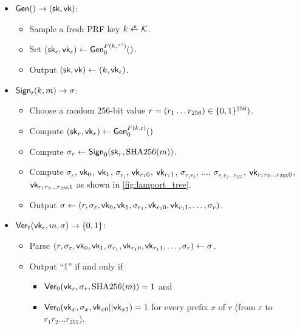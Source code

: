 \begin{framed}
\begin{itemize}
  \item $\mathsf{Gen}() \to ({\mathsf{sk}}, \mathsf{vk})$:
    \begin{itemize}
      \item Sample a fresh PRF key $k \getsr \calK$.
      \item Set $({\mathsf{sk}}_\epsilon, \mathsf{vk}_\epsilon) \gets \mathsf{Gen}_0^{F(k, \text{``''})}()$.
      \item Output $({\mathsf{sk}}, \mathsf{vk}) \gets (k, \mathsf{vk}_\epsilon)$.
    \end{itemize}

  \item $\mathsf{Sign}_t(k, m) \to \sigma$: 
    \begin{itemize}
      \item Choose a random 256-bit value $r = (r_1 \dots r_{256}) \in \{0,1\}^{256})$.
      \item Compute $({\mathsf{sk}}_r, \mathsf{vk}_r) \gets \mathsf{Gen}_0^{F(k, \text{r})}()$
      \item Compute $\sigma_r \gets \mathsf{Sign}_0({\mathsf{sk}}_r, \text{SHA256}(m))$.
      \item Compute $\sigma_\varepsilon$, $\mathsf{vk}_0$, $\mathsf{vk}_1$,
                    $\sigma_{r_1}$, $\mathsf{vk}_{r_1 0}$, $\mathsf{vk}_{r_1 1}$,
                    $\sigma_{r_1 r_2}$, $\ldots$,
                    $\sigma_{r_1 r_2 \ldots r_{255}}$,
                    $\mathsf{vk}_{r_1 r_2 \ldots r_{255} 0}$,
                    $\mathsf{vk}_{r_1 r_2 \ldots r_{255} 1}$
            as shown in \cref{fig:lamport_tree}.
      \item Output $\sigma \gets (r, \sigma_\varepsilon, \mathsf{vk}_0, \mathsf{vk}_1, \sigma_{r_1}, \mathsf{vk}_{r_1 0}, \mathsf{vk}_{r_1 1}, \ldots, \sigma_r)$.
    \end{itemize}
  \item $\mathsf{Ver}_t(\mathsf{vk}_\epsilon, m, \sigma) \to \{0,1\}$:
    \begin{itemize}
      \item Parse $(r, \sigma_\varepsilon, \mathsf{vk}_0, \mathsf{vk}_1, \sigma_{r_1}, \mathsf{vk}_{r_1 0}, \mathsf{vk}_{r_1 1}, \ldots, \sigma_r) \gets \sigma$.
      \item Output ``1'' if and only if 
        \begin{itemize}
          \item $\mathsf{Ver}_0(\mathsf{vk}_r, \sigma_r, \text{SHA256}(m)) = 1$
        and 
      \item $\mathsf{Ver}_0(\mathsf{vk}_x, \sigma_x, \mathsf{vk}_{x0} || \mathsf{vk}_{x1}) = 1$ for every
        prefix $x$ of $r$ (from $\varepsilon$ to $r_1 r_2 \ldots r_{255}$).
        \end{itemize}
    \end{itemize}
\end{itemize}
\end{framed}



